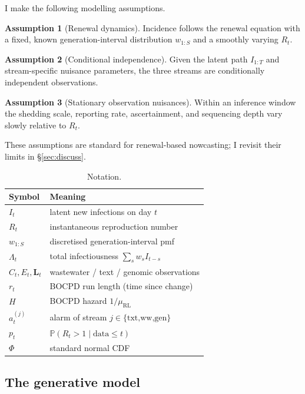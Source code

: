 \documentclass[10pt,twocolumn]{article}
\theoremstyle{definition}
\newtheorem{assumption}{Assumption}
\newcommand{\Rt}{R_t}
\newcommand{\Prob}{\mathbb{P}}
\begin{document}
I make the following modelling assumptions.
\begin{assumption}[Renewal dynamics]\label{ass:renewal}
Incidence follows the renewal equation with a fixed, known generation-interval
distribution $w_{1:S}$ and a smoothly varying $\Rt$.
\end{assumption}
\begin{assumption}[Conditional independence]\label{ass:ci}
Given the latent path $I_{1:T}$ and stream-specific nuisance parameters, the
three streams are conditionally independent observations.
\end{assumption}
\begin{assumption}[Stationary observation nuisances]\label{ass:nuis}
Within an inference window the shedding scale, reporting rate, ascertainment, and
sequencing depth vary slowly relative to $\Rt$.
\end{assumption}
These assumptions are standard for renewal-based nowcasting; I revisit their
limits in \S\ref{sec:discuss}.

\begin{table}[t]
\centering\footnotesize
\caption{Notation.}
\label{tab:notation}
\begin{tabular}{ll}
\toprule
Symbol & Meaning \\
\midrule
$I_t$ & latent new infections on day $t$ \\
$\Rt$ & instantaneous reproduction number \\
$w_{1:S}$ & discretised generation-interval pmf \\
$\Lambda_t$ & total infectiousness $\sum_s w_s I_{t-s}$ \\
$C_t, E_t, \mathbf L_t$ & wastewater / text / genomic observations \\
$r_t$ & BOCPD run length (time since change) \\
$H$ & BOCPD hazard $1/\mu_{\mathrm{RL}}$ \\
$a^{(j)}_t$ & alarm of stream $j\in\{\text{txt,ww,gen}\}$ \\
$p_t$ & $\Prob(\Rt>1\mid\text{data}\le t)$ \\
$\Phi$ & standard normal CDF \\
\bottomrule
\end{tabular}
\end{table}

\subsection{The generative model}
\label{sec:model}
\end{document}
